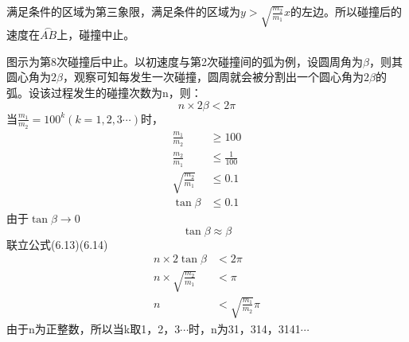 \begin{problemset}
	满足条件的区域为第三象限，满足条件的区域为$y>\sqrt{\frac{m_2}{m_1}}x$的左边。所以碰撞后的速度在$\overset{\frown}{AB}$上，碰撞中止。

	图示为第8次碰撞后中止。以初速度与第2次碰撞间的弧为例，设圆周角为$\beta$，则其圆心角为$2\beta$，观察可知每发生一次碰撞，圆周就会被分割出一个圆心角为$2\beta$的弧。设该过程发生的碰撞次数为n，则：
	\begin{equation}
		n\times 2\beta<2\pi
	\end{equation}
	当$\frac{m_1}{m_2}=100^k(k=1,2,3\cdots)$时，
	\begin{align*}
		\frac{m_1}{m_2}&\ge 100\\
		\frac{m_2}{m_1}&\le \frac{1}{100}\\
		\sqrt{\frac{m_2}{m_1}}&\le 0.1\\
		\tan\beta&\le 0.1
	\end{align*}
	由于$\tan\beta\rightarrow 0$
	\begin{equation}
		\tan\beta\approx\beta
	\end{equation}
	联立公式(6.13)(6.14)
	\begin{align*}
		n\times 2\tan\beta&<2\pi\\
		n\times \sqrt{\frac{m_2}{m_1}}&<\pi\\
		n&<\sqrt{\frac{m_1}{m_2}}\pi
	\end{align*}
	由于n为正整数，所以当k取1，2，3$\cdots$时，n为31，314，3141$\cdots$
\end{problemset}
